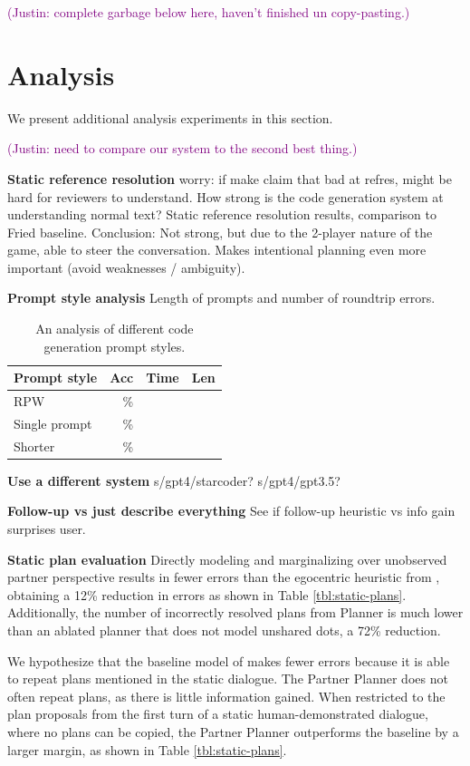 \documentclass[11pt]{article}
\newcommand{\system}{RPW}
\newcommand{\justin}[1]{{{\textcolor{purple}{(Justin: #1)}}}}
\begin{document}
\justin{complete garbage below here, haven't finished un copy-pasting.}

\section{Analysis}
We present additional analysis experiments in this section.

\justin{need to compare our system to the 
second best thing.}

\textbf{Static reference resolution}
worry: if make claim that bad at refres, might be hard for reviewers to understand. How strong is the code generation system at understanding normal text?
Static reference resolution results, comparison to Fried baseline.
Conclusion: Not strong, but due to the 2-player nature of the game,
able to steer the conversation.
Makes intentional planning even more important (avoid weaknesses / ambiguity).


\textbf{Prompt style analysis}
Length of prompts and number of roundtrip errors.

\begin{table}[!t]
\centering
\begin{tabular}{lrrr}
\toprule
Prompt style                   & Acc & Time & Len\\
\midrule
\system{}                      & \%  &    &  \\
Single prompt                  & \%  &    & \\
Shorter                        & \%  &    &  \\
\bottomrule
\end{tabular}
\caption{\label{tbl:prompt}
An analysis of different code generation prompt styles.
}
\end{table}

\textbf{Use a different system}
s/gpt4/starcoder?
s/gpt4/gpt3.5?

\textbf{Follow-up vs just describe everything}
See if follow-up heuristic vs info gain surprises user.

\textbf{Static plan evaluation}
Directly modeling and marginalizing over unobserved partner perspective results in fewer
errors than the egocentric heuristic from \citet{fried}, obtaining a 12\% reduction in errors as shown in Table \ref{tbl:static-plans}.
Additionally, the number of incorrectly resolved plans from Planner is much lower than an ablated planner that does not model unshared dots, a 72\% reduction.

We hypothesize that the baseline model of \citet{fried} makes fewer errors because it is able to repeat plans mentioned in the static dialogue.
The Partner Planner does not often repeat plans, as there is little information gained.
When restricted to the plan proposals from the first turn of a static human-demonstrated dialogue, where no plans can be copied, the Partner Planner outperforms the baseline by a larger margin, as shown in Table \ref{tbl:static-plans}.
\end{document}
